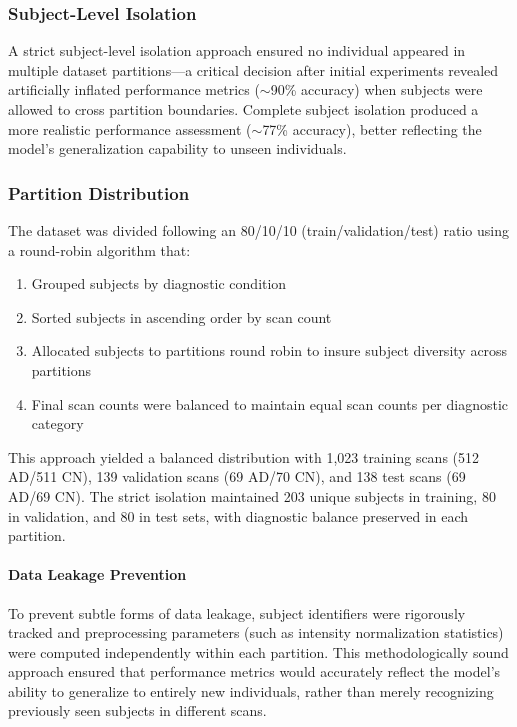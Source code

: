 \documentclass[12pt, a4paper]{article}
\begin{document}
\subsubsection{Subject-Level Isolation}

A strict subject-level isolation approach ensured no individual appeared in multiple dataset partitions—a critical decision after initial experiments revealed artificially inflated performance metrics ($\sim$90\% accuracy) when subjects were allowed to cross partition boundaries. Complete subject isolation produced a more realistic performance assessment ($\sim$77\% accuracy), better reflecting the model's generalization capability to unseen individuals.

\subsubsection{Partition Distribution}

The dataset was divided following an 80/10/10 (train/validation/test) ratio using a round-robin algorithm that:
\begin{enumerate}
    \item Grouped subjects by diagnostic condition
    \item Sorted subjects in ascending order by scan count
    \item Allocated subjects to partitions round robin to insure subject diversity across partitions
    \item Final scan counts were balanced to maintain equal scan counts per diagnostic category
\end{enumerate}

This approach yielded a balanced distribution with 1,023 training scans (512 AD/511 CN), 139 validation scans (69 AD/70 CN), and 138 test scans (69 AD/69 CN). The strict isolation maintained 203 unique subjects in training, 80 in validation, and 80 in test sets, with diagnostic balance preserved in each partition.

\paragraph{Data Leakage Prevention}

To prevent subtle forms of data leakage, subject identifiers were rigorously tracked and preprocessing parameters (such as intensity normalization statistics) were computed independently within each partition. This methodologically sound approach ensured that performance metrics would accurately reflect the model's ability to generalize to entirely new individuals, rather than merely recognizing previously seen subjects in different scans.
\end{document}

